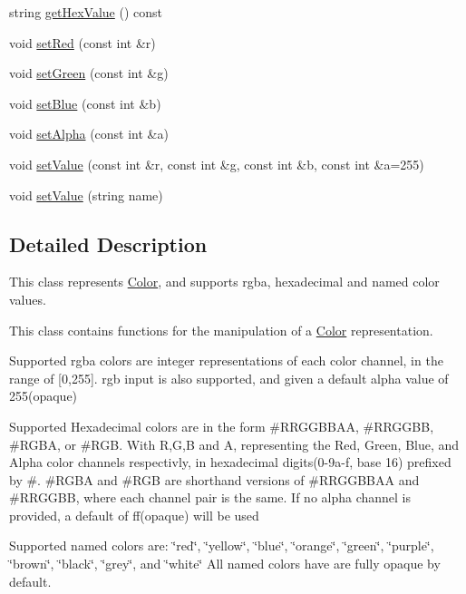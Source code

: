 \begin{DoxyCompactItemize}
\item 
string \hyperlink{classbridges_1_1_color_abdf44b8eb8c79452e38b93c02fb0aa99}{get\+Hex\+Value} () const 
\item 
void \hyperlink{classbridges_1_1_color_a56ff7cf20ccf252ed5fd9d1836693c42}{set\+Red} (const int \&r)
\item 
void \hyperlink{classbridges_1_1_color_ad7522440e9772446b66d699cda307704}{set\+Green} (const int \&g)
\item 
void \hyperlink{classbridges_1_1_color_abbde3c596c48b1870a305164b51dc9b5}{set\+Blue} (const int \&b)
\item 
void \hyperlink{classbridges_1_1_color_af2ab47aa5ccafb74be9ef8e6042093a1}{set\+Alpha} (const int \&a)
\item 
void \hyperlink{classbridges_1_1_color_a1bbb6b478ac6a013d04951f564bab70d}{set\+Value} (const int \&r, const int \&g, const int \&b, const int \&a=255)
\item 
void \hyperlink{classbridges_1_1_color_aa6e1db9aa47275ef829ac0fa96d72190}{set\+Value} (string name)
\end{DoxyCompactItemize}


\subsection{Detailed Description}
This class represents \hyperlink{classbridges_1_1_color}{Color}, and supports rgba, hexadecimal and named color values. 

This class contains functions for the manipulation of a \hyperlink{classbridges_1_1_color}{Color} representation.

Supported rgba colors are integer representations of each color channel, in the range of \mbox{[}0,255\mbox{]}. rgb input is also supported, and given a default alpha value of 255(opaque)

Supported Hexadecimal colors are in the form \#\+R\+R\+G\+G\+B\+B\+A\+A, \#\+R\+R\+G\+G\+B\+B, \#\+R\+G\+B\+A, or \#\+R\+G\+B. With R,G,B and A, representing the Red, Green, Blue, and Alpha color channels respectivly, in hexadecimal digits(0-\/9a-\/f, base 16) prefixed by \textquotesingle{}\#\textquotesingle{}. \#\+R\+G\+B\+A and \#\+R\+G\+B are shorthand versions of \#\+R\+R\+G\+G\+B\+B\+A\+A and \#\+R\+R\+G\+G\+B\+B, where each channel pair is the same. If no alpha channel is provided, a default of \textquotesingle{}ff\textquotesingle{}(opaque) will be used

Supported named colors are\+: \char`\"{}red\char`\"{}, \char`\"{}yellow\char`\"{}, \char`\"{}blue\char`\"{}, \char`\"{}orange\char`\"{}, \char`\"{}green\char`\"{}, \char`\"{}purple\char`\"{}, \char`\"{}brown\char`\"{}, \char`\"{}black\char`\"{}, \char`\"{}grey\char`\"{}, and \char`\"{}white\char`\"{} All named colors have are fully opaque by default.

